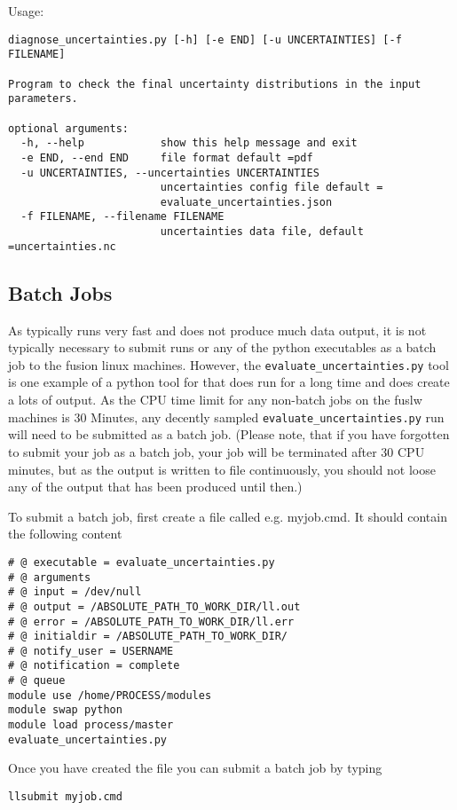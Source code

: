 Usage:
\begin{verbatim}
diagnose_uncertainties.py [-h] [-e END] [-u UNCERTAINTIES] [-f FILENAME]

Program to check the final uncertainty distributions in the input parameters.

optional arguments:
  -h, --help            show this help message and exit
  -e END, --end END     file format default =pdf
  -u UNCERTAINTIES, --uncertainties UNCERTAINTIES
                        uncertainties config file default =
                        evaluate_uncertainties.json
  -f FILENAME, --filename FILENAME
                        uncertainties data file, default =uncertainties.nc

\end{verbatim}



\subsection{Batch Jobs}
As \process\/ typically runs very fast and does not produce much data output, it is not typically necessary to submit \process\/ runs or any of the python executables as a batch job to the fusion linux machines. However, the \texttt{evaluate\_uncertainties.py} tool is one example of a python tool for \process\/ that does run for a long time and does create a lots of output. As the CPU time limit for any non-batch jobs on the fuslw machines is 30 Minutes, any decently sampled \texttt{evaluate\_uncertainties.py} run will need to be submitted as a batch job. (Please note, that if you have forgotten to submit your job as a batch job, your job will be terminated after 30 CPU minutes, but as the output is written to file continuously, you should not loose any of the output that has been produced until then.)

To submit a batch job, first create a file called e.g. myjob.cmd. It should contain the following content
\begin{verbatim}
# @ executable = evaluate_uncertainties.py
# @ arguments
# @ input = /dev/null
# @ output = /ABSOLUTE_PATH_TO_WORK_DIR/ll.out
# @ error = /ABSOLUTE_PATH_TO_WORK_DIR/ll.err
# @ initialdir = /ABSOLUTE_PATH_TO_WORK_DIR/
# @ notify_user = USERNAME
# @ notification = complete
# @ queue
module use /home/PROCESS/modules
module swap python
module load process/master
evaluate_uncertainties.py
\end{verbatim}
Once you have created the file you can submit a batch job by typing
\begin{verbatim}
llsubmit myjob.cmd
\end{verbatim}

